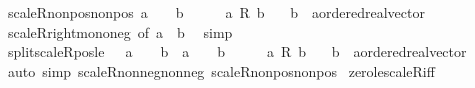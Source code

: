 \begin{isabellebody}
\endisatagproof
{\isafoldproof}%
%
\isadelimproof
\isanewline
%
\endisadelimproof
\isanewline
{}\isamarkupfalse%
\ scaleR{\isacharunderscore}{\kern0pt}nonpos{\isacharunderscore}{\kern0pt}nonpos{\isacharcolon}{\kern0pt}\ {\isachardoublequoteopen}a\ {\isasymle}\ {}\ {\isasymLongrightarrow}\ b\ {\isasymle}\ {}\ {\isasymLongrightarrow}\ {}\ {\isasymle}\ a\ {\isacharasterisk}{\kern0pt}\isactrlsub R\ b{\isachardoublequoteclose}\isanewline
\ \ \ b\ {\isacharcolon}{\kern0pt}{\isacharcolon}{\kern0pt}\ {\isachardoublequoteopen}{\isacharprime}{\kern0pt}a{\isacharcolon}{\kern0pt}{\isacharcolon}{\kern0pt}ordered{\isacharunderscore}{\kern0pt}real{\isacharunderscore}{\kern0pt}vector{\isachardoublequoteclose}\isanewline
%
\isadelimproof
\ \ %
\endisadelimproof
%
\isatagproof
{}\isamarkupfalse%
\ scaleR{\isacharunderscore}{\kern0pt}right{\isacharunderscore}{\kern0pt}mono{\isacharunderscore}{\kern0pt}neg\ {\isacharbrackleft}{\kern0pt}of\ a\ {}\ b{\isacharbrackright}{\kern0pt}\ \isamarkupfalse%
\ simp%
\endisatagproof
{\isafoldproof}%
%
\isadelimproof
\isanewline
%
\endisadelimproof
\isanewline
{}\isamarkupfalse%
\ split{\isacharunderscore}{\kern0pt}scaleR{\isacharunderscore}{\kern0pt}pos{\isacharunderscore}{\kern0pt}le{\isacharcolon}{\kern0pt}\ {\isachardoublequoteopen}{\isacharparenleft}{\kern0pt}{}\ {\isasymle}\ a\ {\isasymand}\ {}\ {\isasymle}\ b{\isacharparenright}{\kern0pt}\ {\isasymor}\ {\isacharparenleft}{\kern0pt}a\ {\isasymle}\ {}\ {\isasymand}\ b\ {\isasymle}\ {}{\isacharparenright}{\kern0pt}\ {\isasymLongrightarrow}\ {}\ {\isasymle}\ a\ {\isacharasterisk}{\kern0pt}\isactrlsub R\ b{\isachardoublequoteclose}\isanewline
\ \ \ b\ {\isacharcolon}{\kern0pt}{\isacharcolon}{\kern0pt}\ {\isachardoublequoteopen}{\isacharprime}{\kern0pt}a{\isacharcolon}{\kern0pt}{\isacharcolon}{\kern0pt}ordered{\isacharunderscore}{\kern0pt}real{\isacharunderscore}{\kern0pt}vector{\isachardoublequoteclose}\isanewline
%
\isadelimproof
\ \ %
\endisadelimproof
%
\isatagproof
{}\isamarkupfalse%
\ {\isacharparenleft}{\kern0pt}auto\ simp{\isacharcolon}{\kern0pt}\ scaleR{\isacharunderscore}{\kern0pt}nonneg{\isacharunderscore}{\kern0pt}nonneg\ scaleR{\isacharunderscore}{\kern0pt}nonpos{\isacharunderscore}{\kern0pt}nonpos{\isacharparenright}{\kern0pt}%
\endisatagproof
{\isafoldproof}%
%
\isadelimproof
\isanewline
%
\endisadelimproof
\isanewline
{}\isamarkupfalse%
\ zero{\isacharunderscore}{\kern0pt}le{\isacharunderscore}{\kern0pt}scaleR{\isacharunderscore}{\kern0pt}iff{\isacharcolon}{\kern0pt}\isanewline

\end{isabellebody}
